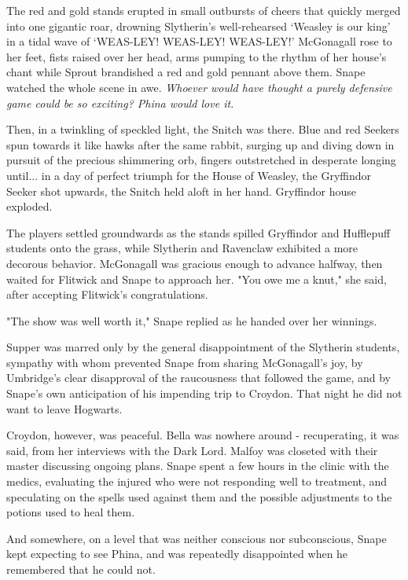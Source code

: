 The red and gold stands erupted in small outbursts of cheers that quickly merged into one gigantic roar, drowning Slytherin's well-rehearsed `Weasley is our king' in a tidal wave of `WEAS-LEY! WEAS-LEY! WEAS-LEY!' McGonagall rose to her feet, fists raised over her head, arms pumping to the rhythm of her house's chant while Sprout brandished a red and gold pennant above them. Snape watched the whole scene in awe. \emph{Whoever would have thought a purely defensive game could be so exciting? Phina would love it.}

Then, in a twinkling of speckled light, the Snitch was there. Blue and red Seekers spun towards it like hawks after the same rabbit, surging up and diving down in pursuit of the precious shimmering orb, fingers outstretched in desperate longing until... in a day of perfect triumph for the House of Weasley, the Gryffindor Seeker shot upwards, the Snitch held aloft in her hand. Gryffindor house exploded.

The players settled groundwards as the stands spilled Gryffindor and Hufflepuff students onto the grass, while Slytherin and Ravenclaw exhibited a more decorous behavior. McGonagall was gracious enough to advance halfway, then waited for Flitwick and Snape to approach her. "You owe me a knut," she said, after accepting Flitwick's congratulations.

"The show was well worth it," Snape replied as he handed over her winnings.

Supper was marred only by the general disappointment of the Slytherin students, sympathy with whom prevented Snape from sharing McGonagall's joy, by Umbridge's clear disapproval of the raucousness that followed the game, and by Snape's own anticipation of his impending trip to Croydon. That night he did not want to leave Hogwarts.

Croydon, however, was peaceful. Bella was nowhere around - recuperating, it was said, from her interviews with the Dark Lord. Malfoy was closeted with their master discussing ongoing plans. Snape spent a few hours in the clinic with the medics, evaluating the injured who were not responding well to treatment, and speculating on the spells used against them and the possible adjustments to the potions used to heal them.

And somewhere, on a level that was neither conscious nor subconscious, Snape kept expecting to see Phina, and was repeatedly disappointed when he remembered that he could not.


